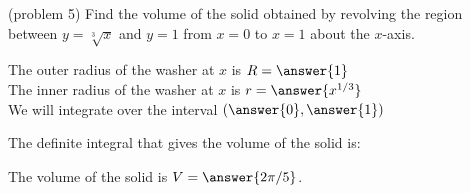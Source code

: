 \documentclass[handout]{ximera}
\begin{document}
\begin{problem}(problem 5)
Find the volume of the solid obtained by revolving the region between $y= \sqrt[3] x$ and $y = 1$ from $x = 0$ to $x = 1$ about the $x$-axis.


The outer radius of the washer at $x$ is $R = \answer{1}$\\
The inner radius of the washer at $x$ is $r = \answer{x^{1/3}}$\\

We will integrate over the interval $\left(\answer{0},\answer{1}\right)$

The definite integral that gives the volume of the solid is:\\
\begin{multipleChoice}
\end{multipleChoice}

The volume of the solid is $V = \answer{2\pi/5 }$.

\end{problem}
\end{document}
